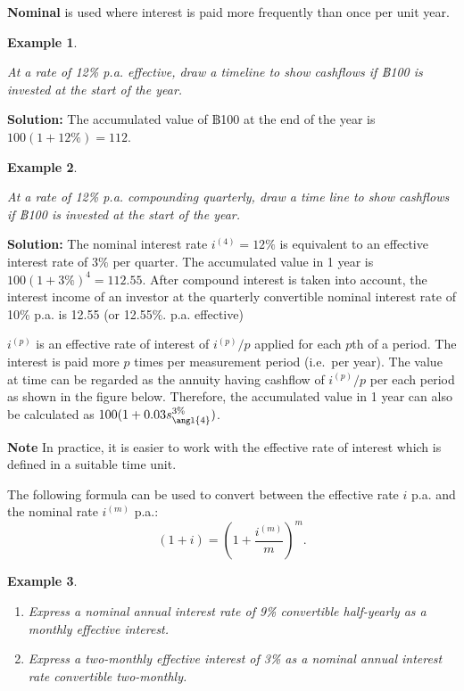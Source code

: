 \documentclass[landscape, 20pt]{extreport}
\theoremstyle{definition}
\theoremstyle{definition}
\newtheorem{example}{Example}[chapter]
\theoremstyle{definition}
\theoremstyle{definition}
\theoremstyle{remark}
\begin{document}
\textbf{Nominal} is used where interest is paid more frequently than once per
unit year.

\newpage \begin{example}
\protect\hypertarget{exm:unlabeled-div-32}{}\label{exm:unlabeled-div-32}

\emph{At a rate of 12\% p.a. effective, draw a timeline to
show cashflows if ฿100 is invested at the start of the year.}

\end{example}

\textbf{Solution:} The accumulated value of ฿100 at the end of the year is
\(100 (1 + 12\%) = 112\).

\newpage \begin{example}
\protect\hypertarget{exm:unlabeled-div-33}{}\label{exm:unlabeled-div-33}

\emph{At a rate of 12\% p.a. compounding quarterly, draw a
time line to show cashflows if ฿100 is invested at the start of the
year.}

\end{example}

\textbf{Solution:} The nominal interest rate \(i^{(4)} = 12\%\) is equivalent
to an effective interest rate of \(3\%\) per quarter. The accumulated
value in 1 year is \(100 (1 + 3\%)^4 = 112.55\). After compound interest
is taken into account, the interest income of an investor at the
quarterly convertible nominal interest rate of 10\% p.a. is 12.55 (or
12.55\%. p.a. effective)

\(i^{(p)}\) is an effective rate of interest of \(i^{(p)}/p\) applied for
each \(p\)th of a period. The interest is paid more \(p\) times per
measurement period (i.e.~per year). The value at time can be regarded as
the annuity having cashflow of \(i^{(p)}/p\) per each period as shown in
the figure below. Therefore, the accumulated value in 1 year can also be
calculated as \(100( 1 + 0.03 s_{\angl{4}}^{3\%})\).

\textbf{Note} In practice, it is easier to work with the effective rate of
interest which is defined in a suitable time unit.

The following formula can be used to convert between the effective rate
\(i\) p.a. and the nominal rate \(i^{(m)}\) p.a.:
\[( 1 + i) = \left( 1 + \frac{i^{(m)}}{m}\right)^m.\]

\newpage \begin{example}
\protect\hypertarget{exm:unlabeled-div-34}{}\label{exm:unlabeled-div-34}

\begin{enumerate}
\def\labelenumi{\arabic{enumi}.}
\item
  \emph{Express a nominal annual interest rate of 9\% convertible
  half-yearly as a monthly effective interest.}
\item
  \emph{Express a two-monthly effective interest of 3\% as a nominal annual
  interest rate convertible two-monthly.}
\end{enumerate}

\end{example}
\end{document}

